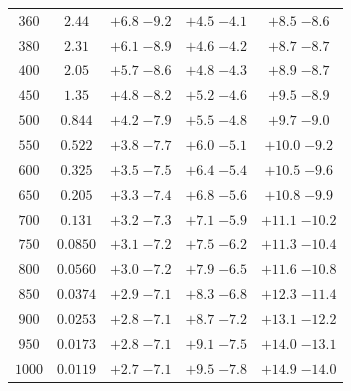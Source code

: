 \begin{table}
\begin{center}
\begin{tabular}{ccccc}
 $360 $&$  2.44 $& $ {+ 6.8}  \;{- 9.2} $ & $ {+ 4.5}  \;{- 4.1} $ & $ {+ 8.5}  \;{- 8.6} $ \\
 $380 $&$  2.31 $& $ {+ 6.1}  \;{- 8.9} $ & $ {+ 4.6}  \;{- 4.2} $ & $ {+ 8.7}  \;{- 8.7} $ \\
 $400 $&$  2.05 $& $ {+ 5.7}  \;{- 8.6} $ & $ {+ 4.8}  \;{- 4.3} $ & $ {+ 8.9}  \;{- 8.7} $ \\
 $450 $&$  1.35 $& $ {+ 4.8}  \;{- 8.2} $ & $ {+ 5.2}  \;{- 4.6} $ & $ {+ 9.5}  \;{- 8.9} $ \\
 $500 $&$  0.844 $& $ {+ 4.2}  \;{- 7.9} $ & $ {+ 5.5}  \;{- 4.8} $ & $ {+ 9.7}  \;{- 9.0} $ \\
 $550 $&$  0.522 $& $ {+ 3.8}  \;{- 7.7} $ & $ {+ 6.0}  \;{- 5.1} $ & $ {+10.0}  \;{- 9.2} $ \\
 $600 $&$  0.325 $& $ {+ 3.5}  \;{- 7.5} $ & $ {+ 6.4}  \;{- 5.4} $ & $ {+10.5}  \;{- 9.6} $ \\
 $650 $&$  0.205 $& $ {+ 3.3}  \;{- 7.4} $ & $ {+ 6.8}  \;{- 5.6} $ & $ {+10.8}  \;{- 9.9} $ \\
 $700 $&$  0.131 $& $ {+ 3.2}  \;{- 7.3} $ & $ {+ 7.1}  \;{- 5.9} $ & $ {+11.1}  \;{-10.2} $ \\
 $750 $&$  0.0850 $& $ {+ 3.1}  \;{- 7.2} $ & $ {+ 7.5}  \;{- 6.2} $ & $ {+11.3}  \;{-10.4} $ \\
 $800 $&$  0.0560 $& $ {+ 3.0}  \;{- 7.2} $ & $ {+ 7.9}  \;{- 6.5} $ & $ {+11.6}  \;{-10.8} $ \\
 $850 $&$  0.0374 $& $ {+ 2.9}  \;{- 7.1} $ & $ {+ 8.3}  \;{- 6.8} $ & $ {+12.3}  \;{-11.4} $ \\
 $900 $&$  0.0253 $& $ {+ 2.8}  \;{- 7.1} $ & $ {+ 8.7}  \;{- 7.2} $ & $ {+13.1}  \;{-12.2} $ \\
 $950 $&$  0.0173 $& $ {+ 2.8}  \;{- 7.1} $ & $ {+ 9.1}  \;{- 7.5} $ & $ {+14.0}  \;{-13.1} $ \\
$1000 $&$  0.0119 $& $ {+ 2.7}  \;{- 7.1} $ & $ {+ 9.5}  \;{- 7.8} $ & $ {+14.9}  \;{-14.0} $ \\


\hline
\end{tabular}
\end{center}
\end{table}



